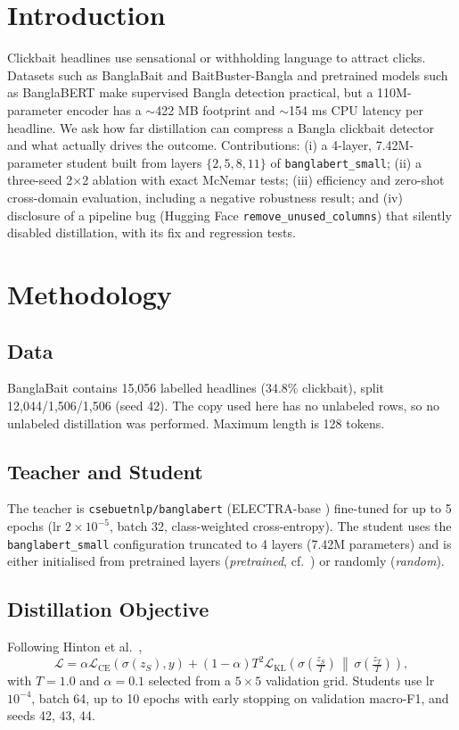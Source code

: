 \documentclass[conference]{IEEEtran}
\begin{document}
\section{Introduction}
Clickbait headlines use sensational or withholding language to attract clicks. Datasets such as BanglaBait \cite{mahtab2023} and BaitBuster-Bangla \cite{imran2023} and pretrained models such as BanglaBERT \cite{bhattacharjee2022} make supervised Bangla detection practical, but a 110M-parameter encoder has a $\sim$422 MB footprint and $\sim$154 ms CPU latency per headline. We ask how far distillation can compress a Bangla clickbait detector and what actually drives the outcome. Contributions: (i) a 4-layer, 7.42M-parameter student built from layers $\{2,5,8,11\}$ of \texttt{banglabert\_small}; (ii) a three-seed 2$\times$2 ablation with exact McNemar tests; (iii) efficiency and zero-shot cross-domain evaluation, including a negative robustness result; and (iv) disclosure of a pipeline bug (Hugging Face \texttt{remove\_unused\_columns}) that silently disabled distillation, with its fix and regression tests.

\section{Methodology}
\subsection{Data}
BanglaBait contains 15,056 labelled headlines (34.8\% clickbait), split 12,044/1,506/1,506 (seed 42). The copy used here has no unlabeled rows, so no unlabeled distillation was performed. Maximum length is 128 tokens.

\subsection{Teacher and Student}
The teacher is \texttt{csebuetnlp/banglabert} (ELECTRA-base \cite{clark2020}) fine-tuned for up to 5 epochs (lr $2\!\times\!10^{-5}$, batch 32, class-weighted cross-entropy). The student uses the \texttt{banglabert\_small} configuration truncated to 4 layers (7.42M parameters) and is either initialised from pretrained layers (\emph{pretrained}, cf.\ \cite{turc2019}) or randomly (\emph{random}).

\subsection{Distillation Objective}
Following Hinton et al.\ \cite{hinton2015},
\begin{equation}
\mathcal{L} = \alpha \mathcal{L}_{\text{CE}}(\sigma(z_S), y) + (1-\alpha) T^2 \mathcal{L}_{\text{KL}}\!\left(\sigma\!\left(\tfrac{z_S}{T}\right)\,\middle\|\,\sigma\!\left(\tfrac{z_T}{T}\right)\right),
\end{equation}
with $T=1.0$ and $\alpha=0.1$ selected from a $5\times5$ validation grid. Students use lr $10^{-4}$, batch 64, up to 10 epochs with early stopping on validation macro-F1, and seeds 42, 43, 44.
\end{document}
